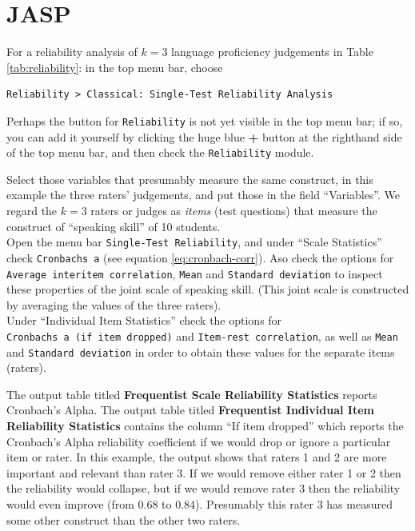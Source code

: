 \documentclass[
]{book}
\begin{document}
\hypertarget{jasp-10}{%
\section{JASP}\label{jasp-10}}

For a reliability analysis of \(k=3\) language proficiency
judgements in Table \ref{tab:reliability}: in the top menu bar, choose\\

\begin{verbatim}
Reliability > Classical: Single-Test Reliability Analysis
\end{verbatim}

Perhaps the button for \texttt{Reliability} is not yet visible in the top menu bar; if so, you can add it yourself by clicking the huge blue \textbf{+} button at the righthand side of the top menu bar, and then check the \texttt{Reliability} module.

Select those variables that presumably measure the same construct, in this example the three raters' judgements, and put those in the field ``Variables''. We regard the \(k=3\) raters or judges as \emph{items} (test questions) that measure the construct of ``speaking skill'' of 10 students.\\
Open the menu bar \texttt{Single-Test\ Reliability}, and under ``Scale Statistics'' check \texttt{Cronbach\textquotesingle{}s\ a} (see equation \eqref{eq:cronbach-corr}). Aso check the options for \texttt{Average\ interitem\ correlation}, \texttt{Mean} and \texttt{Standard\ deviation} to inspect these properties of the joint scale of speaking skill. (This joint scale is constructed by averaging the values of the three raters).\\
Under ``Individual Item Statistics'' check the options for \texttt{Cronbach\textquotesingle{}s\ a\ (if\ item\ dropped)} and \texttt{Item-rest\ correlation}, as well as \texttt{Mean} and \texttt{Standard\ deviation} in order to obtain these values for the separate items (raters).

The output table titled \textbf{Frequentist Scale Reliability Statistics} reports Cronbach's Alpha.
The output table titled \textbf{Frequentist Individual Item Reliability Statistics} contains the column ``If item dropped'' which reports the Cronbach's Alpha reliability coefficient if we would drop or ignore a particular item or rater. In this example, the output shows that raters 1 and 2 are more important and relevant than rater 3. If we would remove either rater 1 or 2 then the reliability would collapse, but if we would remove rater 3 then the reliability would even improve (from 0.68 to 0.84). Presumably this rater 3 has measured some other construct than the other two raters.
\end{document}
